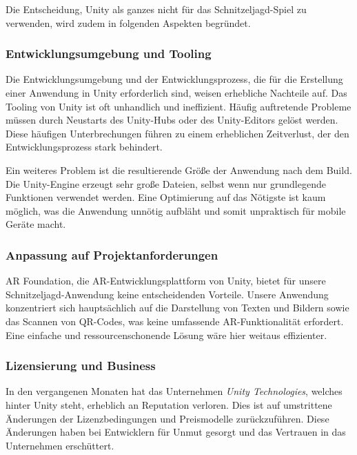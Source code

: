 Die Entscheidung, Unity als ganzes nicht für das Schnitzeljagd-Spiel zu verwenden, wird zudem in folgenden Aspekten begründet.

\subsubsection{Entwicklungsumgebung und Tooling}
\label{subsubsec:implementierung:unity:unityeditor}

Die Entwicklungsumgebung und der Entwicklungsprozess, die für die Erstellung einer Anwendung in Unity erforderlich sind, weisen erhebliche Nachteile auf. Das Tooling von Unity ist oft unhandlich und ineffizient. Häufig auftretende Probleme müssen durch Neustarts des Unity-Hubs oder des Unity-Editors gelöst werden. Diese häufigen Unterbrechungen führen zu einem erheblichen Zeitverlust, der den Entwicklungsprozess stark behindert.

Ein weiteres Problem ist die resultierende Größe der Anwendung nach dem Build. Die Unity-Engine erzeugt sehr große Dateien, selbst wenn nur grundlegende Funktionen verwendet werden. Eine Optimierung auf das Nötigste ist kaum möglich, was die Anwendung unnötig aufbläht und somit unpraktisch für mobile Geräte macht.

\subsubsection{Anpassung auf Projektanforderungen}

AR Foundation, die AR-Entwicklungsplattform von Unity, bietet für unsere Schnitzeljagd-Anwendung keine entscheidenden Vorteile. Unsere Anwendung konzentriert sich hauptsächlich auf die Darstellung von Texten und Bildern sowie das Scannen von QR-Codes, was keine umfassende AR-Funktionalität erfordert. Eine einfache und ressourcenschonende Lösung wäre hier weitaus effizienter.

\subsubsection{Lizensierung und Business}

In den vergangenen Monaten hat das Unternehmen \textit{Unity Technologies}, welches hinter Unity steht, erheblich an Reputation verloren. Dies ist auf umstrittene Änderungen der Lizenzbedingungen und Preismodelle zurückzuführen. Diese Änderungen haben bei Entwicklern für Unmut gesorgt und das Vertrauen in das Unternehmen erschüttert. \autocite{Unity2024:PriceChange}


